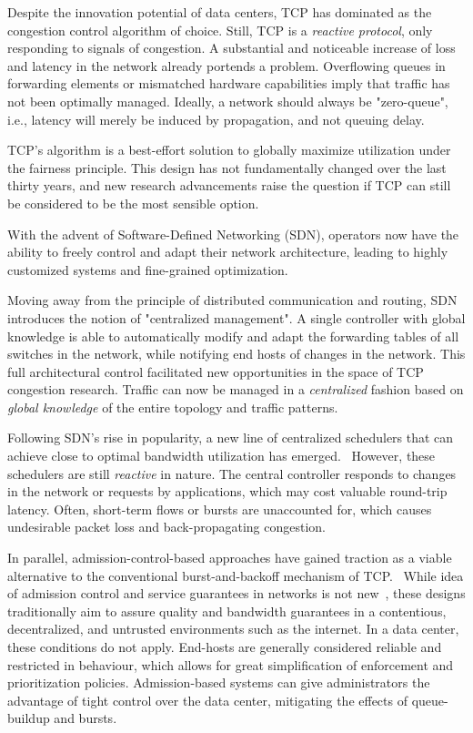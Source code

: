 Despite the innovation potential of data centers, TCP has dominated as 
the congestion control algorithm of choice.
Still, TCP is a \textit{reactive protocol}, only responding to signals of 
congestion. A substantial and noticeable increase of loss and latency in the 
network already portends a problem. Overflowing queues in forwarding elements 
or mismatched hardware capabilities imply that traffic has not been optimally 
managed.
Ideally, a network should always be "zero-queue", i.e., latency 
will merely be induced by propagation, and not queuing delay.

TCP's algorithm is a best-effort solution to globally maximize utilization 
under the fairness principle. This design has not fundamentally changed 
over the last thirty years, and new research advancements raise the question if TCP can still be considered to be the most sensible option.~\cite{pcc,bbr,perc}

With the advent of Software-Defined Networking (SDN), operators now have the 
ability to freely control and adapt their network architecture, leading to 
highly customized systems and fine-grained optimization.~\cite{sdn_road}

Moving away from the principle of distributed communication and routing, SDN 
introduces the notion of "centralized management". A single controller with 
global knowledge is able to automatically modify and adapt the forwarding 
tables of all switches in the network, while notifying end hosts of changes in 
the network.
This full architectural control facilitated new opportunities in the space of 
TCP congestion research. Traffic can now be managed in a  \textit{centralized} 
fashion based on \textit{global knowledge} of the entire topology and traffic 
patterns.

Following SDN's rise in popularity, a new line of centralized schedulers that 
can achieve close to optimal bandwidth utilization has emerged.~\cite{hedera, 
fastpass, microte, b4, dionysus}
However, these schedulers are still \textit{reactive} in nature. The central 
controller responds to changes in the network or requests by applications, 
which may cost valuable round-trip latency. Often, short-term flows or bursts 
are unaccounted for, which causes undesirable packet loss and back-propagating 
congestion.~\cite{perc}

In parallel, admission-control-based approaches have gained traction as a 
viable alternative to the conventional burst-and-backoff mechanism of 
TCP.~\cite{expresspass, fastpass, perc}
While idea of admission control and service guarantees in networks is not 
new~\cite{access_limit, access_limit2}, these designs traditionally 
aim to assure quality and bandwidth guarantees in a contentious, decentralized, 
and untrusted environments such as the internet. In a data center, these 
conditions do not apply. End-hosts are generally considered reliable and 
restricted in behaviour, which allows for great simplification of enforcement 
and prioritization policies. Admission-based systems can give administrators 
the advantage of tight control over the data center, mitigating the effects of 
queue-buildup and bursts.

